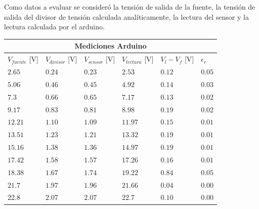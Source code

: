 \documentclass[12pt,a4paper]{article}
\begin{document}
			Como datos a evaluar se consideró la tensión de salida de la fuente, la tensión de salida del divisor de tensión calculada analíticamente, la lectura del sensor y la lectura calculada por el arduino.

			\begin{center}
			{\footnotesize \begin{tabular}{ |l|l|l|l|l|l| }

			\hline
				\multicolumn{6}{|c|}{\textbf{Mediciones Arduino}}\\ \hline
				$V_{fuente}$ [V]& $V_{divisor}$ [V]& $V_{sensor}$ [V]& $V_{lectura}$ [V]& $V_l - V_f$ [V]& $\epsilon _r$\\ \hline
				$ 2.65  $ & $0.24$ & $0.23$ & $2.53  $ & $ 0.12  $  & $  0.05 $\\ \hline                                                                 
				$ 5.06  $ & $0.46$ & $0.45$ & $4.92  $ & $ 0.14  $  & $  0.03 $\\ \hline                                                                 
				$ 7.3   $ & $0.66$ & $0.65$ & $7.17  $ & $ 0.13  $  & $  0.02 $\\ \hline                                                                
				$ 9.17  $ & $0.83$ & $0.81$ & $8.98  $ & $ 0.19  $  & $  0.02 $\\ \hline                                                                 
				$ 12.21 $ & $1.10$ & $1.09$ & $11.97 $ & $ 0.15  $  & $  0.01 $\\ \hline                                                                   
				$ 13.51 $ & $1.23$ & $1.21$ & $13.32 $ & $ 0.19  $  & $  0.01 $\\ \hline                                                                  
				$ 15.16 $ & $1.38$ & $1.36$ & $14.97 $ & $ 0.19  $  & $  0.01 $\\ \hline                                                                  
				$ 17.42 $ & $1.58$ & $1.57$ & $17.26 $ & $ 0.16  $  & $  0.01 $\\ \hline                                                                  
				$ 18.38 $ & $1.67$ & $1.74$ & $19.22 $ & $ 0.84  $  & $  0.05 $\\ \hline                                                                  
				$ 21.7  $ & $1.97$ & $1.96$ & $21.66 $ & $ 0.04  $  & $  0.00 $\\ \hline                                                                   
				$ 22.8  $ & $2.07$ & $2.07$ & $22.7  $ & $ 0.10  $  & $  0.00 $\\ \hline                                                                 

\end{tabular}}
\end{center}
\end{document}
